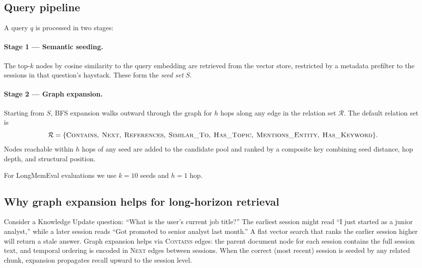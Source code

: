 \documentclass[11pt,a4paper]{article}
\begin{document}
\subsection{Query pipeline}

A query $q$ is processed in two stages:

\paragraph{Stage 1 --- Semantic seeding.}
The top-$k$ nodes by cosine similarity to the query embedding are retrieved from the
vector store, restricted by a metadata prefilter to the sessions in that question's
haystack.
These form the \emph{seed set} $S$.

\paragraph{Stage 2 --- Graph expansion.}
Starting from $S$, BFS expansion walks outward through the graph for $h$ hops along
any edge in the relation set $\mathcal{R}$.
The default relation set is
\begin{equation*}
  \mathcal{R} = \{\textsc{Contains},\;\textsc{Next},\;\textsc{References},\;
    \textsc{Similar\_To},\;\textsc{Has\_Topic},\;\textsc{Mentions\_Entity},\;
    \textsc{Has\_Keyword}\}.
\end{equation*}
Nodes reachable within $h$ hops of any seed are added to the candidate pool and ranked
by a composite key combining seed distance, hop depth, and structural position.

For LongMemEval evaluations we use $k{=}10$ seeds and $h{=}1$ hop.

\subsection{Why graph expansion helps for long-horizon retrieval}

Consider a Knowledge Update question: ``What is the user's current job title?''
The earliest session might read ``I just started as a junior analyst,'' while a
later session reads ``Got promoted to senior analyst last month.''
A flat vector search that ranks the earlier session higher will return a stale
answer.
Graph expansion helps via \textsc{Contains} edges: the parent document node for
each session contains the full session text, and temporal ordering is encoded in
\textsc{Next} edges between sessions.
When the correct (most recent) session is seeded by any related chunk, expansion
propagates recall upward to the session level.
\end{document}
